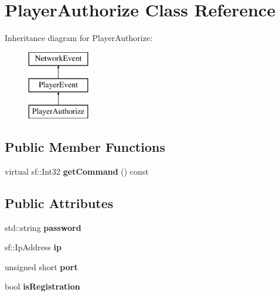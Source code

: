 \hypertarget{class_player_authorize}{\section{Player\-Authorize Class Reference}
\label{class_player_authorize}
}
Inheritance diagram for Player\-Authorize\-:\begin{figure}[H]
\begin{center}
\leavevmode
\includegraphics[height=3.000000cm]{class_player_authorize}
\end{center}
\end{figure}
\subsection*{Public Member Functions}
\begin{DoxyCompactItemize}
\item 
\hypertarget{class_player_authorize_ab0f134f275d46bc2d7a04427432468bd}{virtual sf\-::\-Int32 {\bfseries get\-Command} () const }\label{class_player_authorize_ab0f134f275d46bc2d7a04427432468bd}

\end{DoxyCompactItemize}
\subsection*{Public Attributes}
\begin{DoxyCompactItemize}
\item 
\hypertarget{class_player_authorize_acc5cf75a721dff4241d66fccb7aec7b5}{std\-::string {\bfseries password}}\label{class_player_authorize_acc5cf75a721dff4241d66fccb7aec7b5}

\item 
\hypertarget{class_player_authorize_a988ccf8f80f373afce05210d5d98eade}{sf\-::\-Ip\-Address {\bfseries ip}}\label{class_player_authorize_a988ccf8f80f373afce05210d5d98eade}

\item 
\hypertarget{class_player_authorize_ac4b126e0754072f3556afe6f9f050243}{unsigned short {\bfseries port}}\label{class_player_authorize_ac4b126e0754072f3556afe6f9f050243}

\item 
\hypertarget{class_player_authorize_a45af7e978b98ba90b64696f0b9864b37}{bool {\bfseries is\-Registration}}\label{class_player_authorize_a45af7e978b98ba90b64696f0b9864b37}

\end{DoxyCompactItemize}
